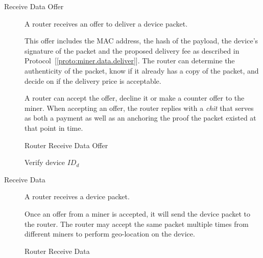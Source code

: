 \documentclass[letterpaper,11pt]{article}
\begin{document}
\begin{description}

    \item [Receive Data Offer] A router receives an offer to deliver a device packet.

      This offer includes the MAC address, the hash of the payload, the device's signature of the packet and the proposed delivery fee as described in Protocol~[\ref{proto:miner.data.deliver}]. The router can determine the authenticity of the packet, know if it already has a copy of the packet, and decide on if the delivery price is acceptable.

      A router can accept the offer, decline it or make a counter offer to the miner. When accepting an offer, the router replies with a \emph{chit} that serves as both a payment as well as an anchoring the proof the packet existed at that point in time.

    \begin{algorithm}[!htb]
      \DontPrintSemicolon
      \caption{Router Receive Data Offer}\label{proto:router.offer.recv}

       {
        Verify device $ID_d$ \;
      }
    \end{algorithm}
    \FloatBarrier


    \item [Receive Data] A router receives a device packet.

      Once an offer from a miner is accepted, it will send the device packet to the router. The router may accept the same packet multiple times from different miners to perform geo-location on the device.

    \begin{algorithm}[!htb]
      \DontPrintSemicolon
      \caption{Router Receive Data }\label{proto:router.data.recv}


\end{algorithm}
\end{description}
\end{document}
